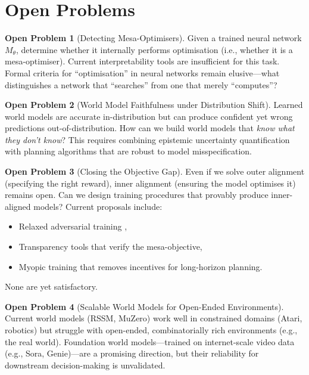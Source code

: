 \documentclass[11pt,a4paper]{article}
\theoremstyle{definition}
\newtheorem{openproblem}{Open Problem}
\begin{document}
\section{Open Problems}\label{sec:open}

\begin{openproblem}[Detecting Mesa-Optimisers]
Given a trained neural network $M_\theta$, determine whether it
internally performs optimisation (i.e., whether it is a mesa-optimiser).
Current interpretability tools are insufficient for this task. Formal
criteria for ``optimisation'' in neural networks remain elusive---what
distinguishes a network that ``searches'' from one that merely
``computes''?
\end{openproblem}

\begin{openproblem}[World Model Faithfulness under Distribution Shift]
Learned world models are accurate in-distribution but can produce
confident yet wrong predictions out-of-distribution. How can we build
world models that \emph{know what they don't know}? This requires
combining epistemic uncertainty quantification with planning algorithms
that are robust to model misspecification.
\end{openproblem}

\begin{openproblem}[Closing the Objective Gap]
Even if we solve outer alignment (specifying the right reward), inner
alignment (ensuring the model optimises it) remains open. Can we design
training procedures that provably produce inner-aligned models? Current
proposals include:
\begin{itemize}
  \item Relaxed adversarial training \cite{hubinger2019relaxed},
  \item Transparency tools that verify the mesa-objective,
  \item Myopic training that removes incentives for long-horizon
    planning.
\end{itemize}
None are yet satisfactory.
\end{openproblem}

\begin{openproblem}[Scalable World Models for Open-Ended Environments]
Current world models (RSSM, MuZero) work well in constrained domains
(Atari, robotics) but struggle with open-ended, combinatorially rich
environments (e.g., the real world). Foundation world models---trained
on internet-scale video data (e.g., Sora, Genie)---are a promising
direction, but their reliability for downstream decision-making is
unvalidated.
\end{openproblem}
\end{document}
